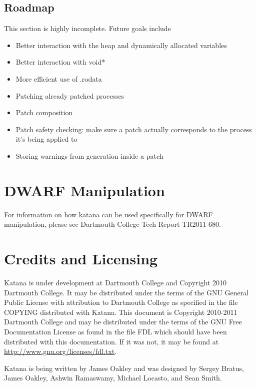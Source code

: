 \documentclass[11pt]{article}
\begin{document}
\subsection{Roadmap}
\label{sec-3.14}

   This section is highly incomplete. Future goals include
\begin{itemize}
\item Better interaction with the heap and dynamically allocated variables
\item Better interaction with void*
\item More efficient use of .rodata
\item Patching already patched processes
\item Patch composition
\item Patch safety checking: make sure a patch actually corresponds to
     the process it's being applied to
\item Storing warnings from generation inside a patch
\end{itemize}
\section{DWARF Manipulation}
\label{sec-4}

  For information on how katana can be used specifically for DWARF
  manipulation, please see Dartmouth College Tech Report TR2011-680.
\section{Credits and Licensing}
\label{sec-5}

  Katana is under development at Dartmouth College and Copyright 2010
  Dartmouth College. It may be distributed under the terms of the GNU
  General Public License with attribution to Dartmouth College as
  specified in the file COPYING distributed with Katana. This document
  is Copyright 2010-2011 Dartmouth College and may be distributed
  under the terms of the GNU Free Documentation License as found in
  the file FDL which should have been distributed with this
  documentation. If it was not, it may be found at
  \href{http://www.gnu.org/licenses/fdl.txt}{http://www.gnu.org/licenses/fdl.txt}.

  Katana is being written by James Oakley and was designed by Sergey
  Bratus, James Oakley, Ashwin Ramaswamy, Michael Locasto, and Sean
  Smith.
\end{document}
